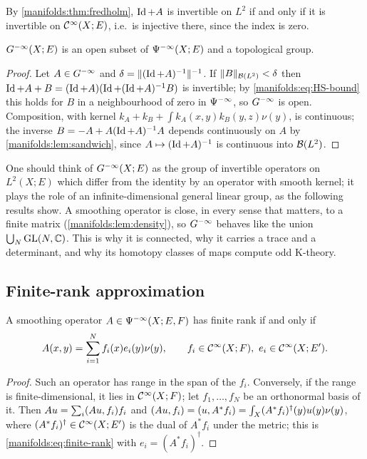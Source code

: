 By \cref{manifolds:thm:fredholm}, $\operatorname{Id}+A$ is invertible on $L^2$ if and only if it is
invertible on $\mathcal{C}^\infty(X;E)$, i.e.\ is injective there, since the index is zero.

\begin{proposition}\label{manifolds:prop:G}
$G^{-\infty}(X;E)$ is an open subset of $\Psi^{-\infty}(X;E)$ and a topological group.
\end{proposition}
\begin{proof}
Let $A\in G^{-\infty}$ and $\delta=\|(\operatorname{Id}+A)^{-1}\|^{-1}$. If $\|B\|_{\mathcal{B}(L^2)}<\delta$ then
$\operatorname{Id}+A+B=(\operatorname{Id}+A)(\operatorname{Id}+(\operatorname{Id}+A)^{-1}B)$ is invertible; by \eqref{manifolds:eq:HS-bound}
this holds for $B$ in a neighbourhood of zero in $\Psi^{-\infty}$, so $G^{-\infty}$ is open.
Composition, with kernel $k_A+k_B+\int k_A(x,y)k_B(y,z)\nu(y)$, is continuous; the inverse
$B=-A+A(\operatorname{Id}+A)^{-1}A$ depends continuously on $A$ by \cref{manifolds:lem:sandwich},
since $A\mapsto(\operatorname{Id}+A)^{-1}$ is continuous into $\mathcal{B}(L^2)$.
\end{proof}

\begin{discussion}
One should think of $G^{-\infty}(X;E)$ as the group of invertible operators on $L^2(X;E)$
which differ from the identity by an operator with smooth kernel; it plays the
role of an infinite-dimensional general linear group, as the following results
show. A smoothing operator is close, in every sense that matters, to a finite
matrix (\cref{manifolds:lem:density}), so $G^{-\infty}$ behaves like the union
$\bigcup_N\operatorname{GL}(N,\mathbb{C})$. This is why it is connected, why it carries a trace and a
determinant, and why its homotopy classes of maps compute odd K-theory.
\end{discussion}

\subsection{Finite-rank approximation}
\begin{lemma}\label{manifolds:lem:finite-rank}
A smoothing operator $A\in\Psi^{-\infty}(X;E,F)$ has finite rank if and only if
\begin{equation}\label{manifolds:eq:finite-rank}
A(x,y)=\sum_{i=1}^Nf_i(x)e_i(y)\nu(y),\qquad f_i\in\CI(X;F),\ e_i\in\CI(X;E').
\end{equation}
\end{lemma}
\begin{proof}
Such an operator has range in the span of the $f_i$. Conversely, if the range is
finite-dimensional, it lies in $\mathcal{C}^\infty(X;F)$; let $f_1,\dots,f_N$ be an orthonormal basis of
it. Then $Au=\sum_i( Au, f_i)f_i$ and
$( Au, f_i)=( u, A^*f_i)=\int_X(A^*f_i)^\dagger(y)u(y)\nu(y)$, where
$(A^*f_i)^\dagger\in\mathcal{C}^\infty(X;E')$ is the dual of $A^*f_i$ under the metric; this is
\eqref{manifolds:eq:finite-rank} with $e_i=(A^*f_i)^\dagger$.
\end{proof}

